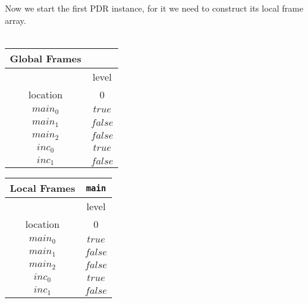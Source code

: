 \documentclass{article}
\begin{document}
	Now we start the first PDR instance, for it we need to construct its local frame array. \\ \\
	\begin{minipage}{.5\textwidth}
		\setlength\tabcolsep{0.35em}
		\begin{center}
			\begin{tabu}{cc}
				Global Frames \\
				\toprule
				& level \\
				\cmidrule(lr){2-2}
				location & 0 \\
				$main_0$ & $true$ \\
				$main_1$ & $false$ \\
				$main_2$ & $false$ \\
				$inc_0$ & $true$ \\
				$inc_1$ & $false$\\
				\bottomrule
			\end{tabu}
		\end{center}
	\end{minipage}
	\hfill
	\begin{minipage}{.4\textwidth}
	\setlength\tabcolsep{0.35em}
		\begin{center}
			\begin{tabu}{cc}
				Local Frames & \texttt{main} \\
				\toprule
				& level \\
				\cmidrule(lr){2-2}
				location & 0 \\
				\cmidrule{1-2}
				$main_0$ & $true$ \\
				$main_1$ & $false$ \\
				$main_2$ & $false$ \\
				$inc_0$ & $true$ \\
				$inc_1$ & $false$\\
				\bottomrule
			\end{tabu}
		\end{center}	
	\end{minipage}
	
\end{document}
